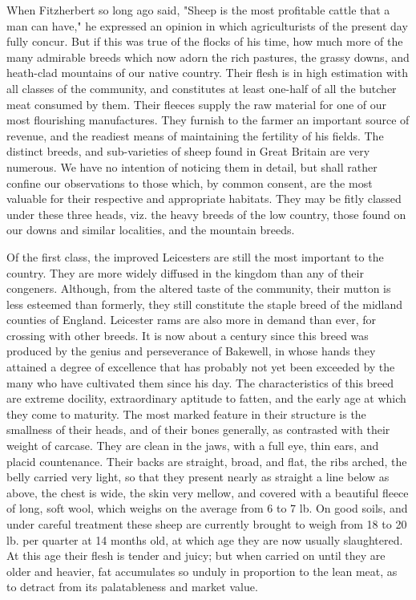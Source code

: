 \documentclass{article}
\begin{document}
When Fitzherbert so long ago said, "Sheep is the most profitable cattle that a man can have," he expressed an opinion in which agriculturists of the present day fully concur. But if this was true of the flocks of his time, how much more of the many admirable breeds which now adorn the rich pastures, the grassy downs, and heath-clad mountains of our native country. Their flesh is in high estimation with all classes of the community, and constitutes at least one-half of all the butcher meat consumed by them. Their fleeces supply the raw material for one of our most flourishing manufactures. They furnish to the farmer an important source of revenue, and the readiest means of maintaining the fertility of his fields. The distinct breeds, and sub-varieties of sheep found in Great Britain are very numerous. We have no intention of noticing them in detail, but shall rather confine our observations to those which, by common consent, are the most valuable for their respective and appropriate habitats. They may be fitly classed under these three heads, viz. the heavy breeds of the low country, those found on our downs and similar localities, and the mountain breeds.

Of the first class, the improved Leicesters are still the most important to the country. They are more widely diffused in the kingdom than any of their congeners. Although, from the altered taste of the community, their mutton is less esteemed than formerly, they still constitute the staple breed of the midland counties of England. Leicester rams are also more in demand than ever, for crossing with other breeds. It is now about a century since this breed was produced by the genius and perseverance of Bakewell, in whose hands they attained a degree of excellence that has probably not yet been exceeded by the many who have cultivated them since his day. The characteristics of this breed are extreme docility, extraordinary aptitude to fatten, and the early age at which they come to maturity. The most marked feature in their structure is the smallness of their heads, and of their bones generally, as contrasted with their weight of carcase. They are clean in the jaws, with a full eye, thin ears, and placid countenance. Their backs are straight, broad, and flat, the ribs arched, the belly carried very light, so that they present nearly as straight a line below as above, the chest is wide, the skin very mellow, and covered with a beautiful fleece of long, soft wool, which weighs on the average from 6 to 7 lb. On good soils, and under careful treatment these sheep are currently brought to weigh from 18 to 20 lb. per quarter at 14 months old, at which age they are now usually slaughtered. At this age their flesh is tender and juicy; but when carried on until they are older and heavier, fat accumulates so unduly in proportion to the lean meat, as to detract from its palatableness and market value.
\end{document}
